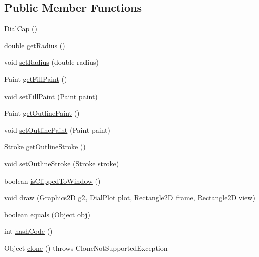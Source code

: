 \subsection*{Public Member Functions}
\begin{DoxyCompactItemize}
\item 
\mbox{\hyperlink{classorg_1_1jfree_1_1chart_1_1plot_1_1dial_1_1_dial_cap_a5ff5011fcda51ce477430d54f2f6c908}{Dial\+Cap}} ()
\item 
double \mbox{\hyperlink{classorg_1_1jfree_1_1chart_1_1plot_1_1dial_1_1_dial_cap_ad9d82886f81da0f1e38a92e2d6f6b41d}{get\+Radius}} ()
\item 
void \mbox{\hyperlink{classorg_1_1jfree_1_1chart_1_1plot_1_1dial_1_1_dial_cap_ad614d37cf451d4909c1a4de4ba2da69e}{set\+Radius}} (double radius)
\item 
Paint \mbox{\hyperlink{classorg_1_1jfree_1_1chart_1_1plot_1_1dial_1_1_dial_cap_ada4f2b656e3b997bbdbdc50bc287ebc8}{get\+Fill\+Paint}} ()
\item 
void \mbox{\hyperlink{classorg_1_1jfree_1_1chart_1_1plot_1_1dial_1_1_dial_cap_a2fc72d3eee10eda463f89cf4590ebe01}{set\+Fill\+Paint}} (Paint paint)
\item 
Paint \mbox{\hyperlink{classorg_1_1jfree_1_1chart_1_1plot_1_1dial_1_1_dial_cap_ae42cbd4fbc603f98a00e9bcd9e90365c}{get\+Outline\+Paint}} ()
\item 
void \mbox{\hyperlink{classorg_1_1jfree_1_1chart_1_1plot_1_1dial_1_1_dial_cap_af4948903ce3b7d78acc4cc715c5f6ab9}{set\+Outline\+Paint}} (Paint paint)
\item 
Stroke \mbox{\hyperlink{classorg_1_1jfree_1_1chart_1_1plot_1_1dial_1_1_dial_cap_a6bb21a21b3417917b4e1a9e3a89c9c9a}{get\+Outline\+Stroke}} ()
\item 
void \mbox{\hyperlink{classorg_1_1jfree_1_1chart_1_1plot_1_1dial_1_1_dial_cap_a1e220f1d41c509b7be9708871e0d3078}{set\+Outline\+Stroke}} (Stroke stroke)
\item 
boolean \mbox{\hyperlink{classorg_1_1jfree_1_1chart_1_1plot_1_1dial_1_1_dial_cap_a46ceaed99922a02c843f115a3691d467}{is\+Clipped\+To\+Window}} ()
\item 
void \mbox{\hyperlink{classorg_1_1jfree_1_1chart_1_1plot_1_1dial_1_1_dial_cap_a9faeb676370884ac4f983455d04a54da}{draw}} (Graphics2D g2, \mbox{\hyperlink{classorg_1_1jfree_1_1chart_1_1plot_1_1dial_1_1_dial_plot}{Dial\+Plot}} plot, Rectangle2D frame, Rectangle2D view)
\item 
boolean \mbox{\hyperlink{classorg_1_1jfree_1_1chart_1_1plot_1_1dial_1_1_dial_cap_ad1696cbef8c9d3b9c37989e3c828b4c5}{equals}} (Object obj)
\item 
int \mbox{\hyperlink{classorg_1_1jfree_1_1chart_1_1plot_1_1dial_1_1_dial_cap_ae1a81078f7e377e25331504c25099612}{hash\+Code}} ()
\item 
Object \mbox{\hyperlink{classorg_1_1jfree_1_1chart_1_1plot_1_1dial_1_1_dial_cap_a68ca1a29601bd9339c36113124a80b11}{clone}} ()  throws Clone\+Not\+Supported\+Exception 
\end{DoxyCompactItemize}
